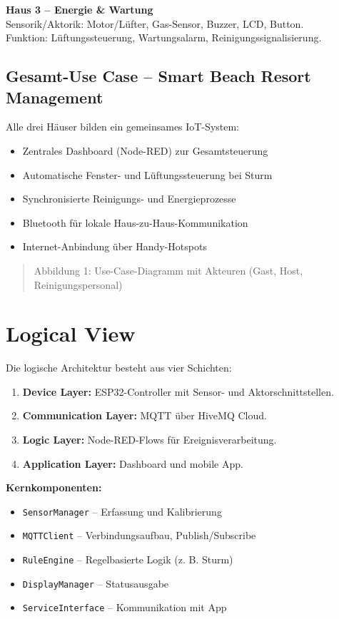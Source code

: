 \documentclass[12pt,a4paper]{article}
\begin{document}
\vspace{0.5em}
\textbf{Haus 3 – Energie \& Wartung}\\
Sensorik/Aktorik: Motor/Lüfter, Gas-Sensor, Buzzer, LCD, Button.\\
Funktion: Lüftungssteuerung, Wartungsalarm, Reinigungssignalisierung.

\subsection{Gesamt-Use Case – Smart Beach Resort Management}
Alle drei Häuser bilden ein gemeinsames IoT-System:
\begin{itemize}[noitemsep]
  \item Zentrales Dashboard (Node-RED) zur Gesamtsteuerung
  \item Automatische Fenster- und Lüftungssteuerung bei Sturm
  \item Synchronisierte Reinigungs- und Energieprozesse
  \item Bluetooth für lokale Haus-zu-Haus-Kommunikation
  \item Internet-Anbindung über Handy-Hotspots
\end{itemize}

\begin{quote}
Abbildung 1: Use-Case-Diagramm mit Akteuren (Gast, Host, Reinigungspersonal)
\end{quote}

\newpage
\section{Logical View}
Die logische Architektur besteht aus vier Schichten:
\begin{enumerate}[noitemsep]
  \item \textbf{Device Layer:} ESP32-Controller mit Sensor- und Aktorschnittstellen.
  \item \textbf{Communication Layer:} MQTT über HiveMQ Cloud.
  \item \textbf{Logic Layer:} Node-RED-Flows für Ereignisverarbeitung.
  \item \textbf{Application Layer:} Dashboard und mobile App.
\end{enumerate}

\textbf{Kernkomponenten:}
\begin{itemize}[noitemsep]
  \item \texttt{SensorManager} – Erfassung und Kalibrierung
  \item \texttt{MQTTClient} – Verbindungsaufbau, Publish/Subscribe
  \item \texttt{RuleEngine} – Regelbasierte Logik (z. B. Sturm)
  \item \texttt{DisplayManager} – Statusausgabe
  \item \texttt{ServiceInterface} – Kommunikation mit App
\end{itemize}
\end{document}
